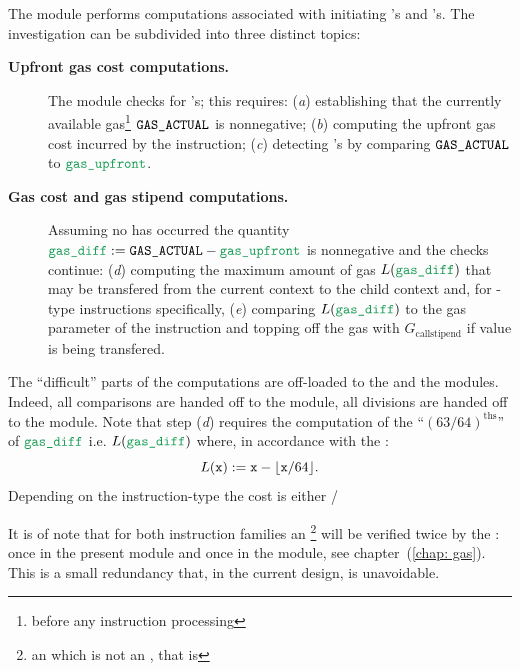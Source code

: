 The \stpMod{} module performs computations associated with initiating 's and 's. The investigation can be subdivided into three distinct topics:
\begin{description}
	\item[\colorbox{solarized-orange}{\textbf{Upfront gas cost computations.}}]
		The module checks for \oogxSH{}'s; this requires:
		(\emph{a}) establishing that the currently available gas\footnote{before any instruction processing} $\texttt{GAS}\texttt{\_ACTUAL}$ is nonnegative;
		(\emph{b}) computing the upfront gas cost \locGasUpfront{} incurred by the instruction;
		(\emph{c}) detecting \oogxSH{}'s by comparing $\texttt{GAS}\texttt{\_ACTUAL}$ to $\locGasUpfront$.
	\item[\colorbox{solarized-green}{\textbf{Gas cost and gas stipend computations.}}]
		Assuming no \oogxSH{} has occurred the quantity $\locDiff := \gasActual - \locGasUpfront$ is nonnegative and the checks continue:
		(\emph{d})
		computing the maximum amount of gas $L(\locDiff)$ that may be transfered from the current context to the child context and,
		for -type instructions specifically,
		(\emph{e})  comparing $L(\locDiff)$ to the gas parameter of the instruction and topping off the gas with $G_\text{callstipend}$ if value is being transfered.
\end{description}
The ``difficult'' parts of the computations are off-loaded to the \wcpMod{} and the \modMod{} modules. Indeed, all comparisons are handed off to the \wcpMod{} module, all divisions are handed off to the \modMod{} module. Note that step (\emph{d}) requires the computation of the ``$(63/64)^{\text{ths}}$'' of $\locDiff{}$ i.e. $L(\locDiff)$ where, in accordance with the \cite{EYP-London}:
\[ L(\texttt{x}) := \texttt{x} - \lfloor \texttt{x}/64 \rfloor . \]
\saNote{} Depending on the instruction-type the \locGasUpfront{} cost is either \locGasUpfrontCall{} / \locGasUpfrontCreate{}

\saNote{} It is of note that for both instruction families an \oogxSH{}\footnote{an \oogxSH{} which is not an \mxpxSH{}, that is} will be verified twice by the \zkEvm{}:
once in the present \stpMod{} module and
once in the \gasMod{} module, see chapter~(\ref{chap: gas}).
This is a small redundancy that, in the current design, is unavoidable.
